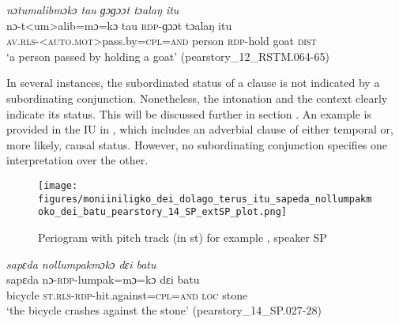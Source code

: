{
	\ex
	\label{ex: notumalibmoko tau goɔɡɔot toalang itu}
	\textit{nɔtumalibmɔkɔ tau ɡɔɡɔɔt tɔalaŋ itu} \\
	\gll  nɔ-t<um>alib=mɔ=kɔ tau \textsc{rdp}-ɡɔɔt tɔalaŋ itu\\
	\textsc{av.rls}-\textsc{<auto.mot>}pass.by\textsc{=cpl=and} person \textsc{rdp}-hold goat \textsc{dist}\\
	\glt `a person passed by holding a goat'
	\hfill(pearstory\_12\_RSTM.064-65)
}
\z
\z



In several instances, the subordinated status of a clause is not indicated by a subordinating conjunction. Nonetheless, the intonation and the context clearly indicate its status. This will be discussed further in section . An example is provided in the IU in , which includes an adverbial clause of either temporal or, more likely, causal status. However, no subordinating conjunction specifies one interpretation over the other.



\begin{figure}
	\texttt{[image: figures/moniiniligko\_dei\_dolago\_terus\_itu\_sapeda\_nollumpakmoko\_dei\_batu\_pearstory\_14\_SP\_extSP\_plot.png]}
	\caption{Periogram with pitch track (in st) for example , speaker SP}
	\label{pitch:free AdvCl}
\end{figure}

\newpage
\ea
\label{ex:free AdvCl}

{
	\ex
	\label{ex:sapeda nollumpakmoko dɛi batu2}
	\textit{sapɛda nollumpakmɔkɔ dɛi batu} \\
	\gll sapɛda nɔ-\textsc{rdp}-lumpak=mɔ=kɔ dɛi batu\\
	bicycle \textsc{st.rls-rdp}-hit.against\textsc{=cpl=and} \textsc{loc} stone\\
	\glt `the bicycle crashes against the stone'
	\hfill(pearstory\_14\_SP.027-28)
}
\z
\z


